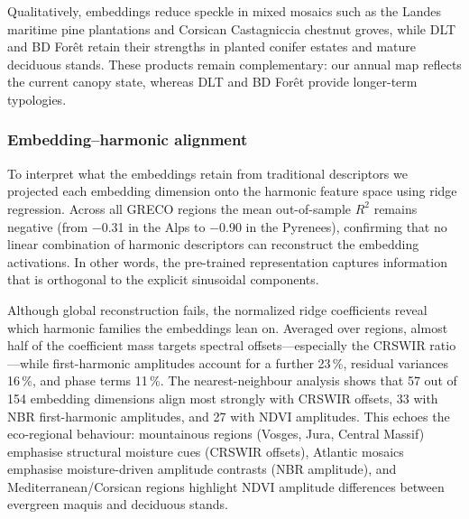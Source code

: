 \documentclass[utf8]{FrontiersinHarvard}
\begin{document}
Qualitatively, embeddings reduce speckle in mixed mosaics such as the Landes maritime pine plantations and Corsican Castagniccia chestnut groves, while DLT and BD Forêt retain their strengths in planted conifer estates and mature deciduous stands. These products remain complementary: our annual map reflects the current canopy state, whereas DLT and BD Forêt provide longer-term typologies.

\subsubsection{Embedding–harmonic alignment}

To interpret what the embeddings retain from traditional descriptors we projected each embedding dimension onto the harmonic feature space using ridge regression. Across all GRECO regions the mean out-of-sample \(R^2\) remains negative (from −0.31 in the Alps to −0.90 in the Pyrenees), confirming that no linear combination of harmonic descriptors can reconstruct the embedding activations. In other words, the pre-trained representation captures information that is orthogonal to the explicit sinusoidal components.

Although global reconstruction fails, the normalized ridge coefficients reveal which harmonic families the embeddings lean on. Averaged over regions, almost half of the coefficient mass targets spectral offsets—especially the CRSWIR ratio—while first-harmonic amplitudes account for a further 23\,\%, residual variances 16\,\%, and phase terms 11\,\%. The nearest-neighbour analysis shows that 57 out of 154 embedding dimensions align most strongly with CRSWIR offsets, 33 with NBR first-harmonic amplitudes, and 27 with NDVI amplitudes. This echoes the eco-regional behaviour: mountainous regions (Vosges, Jura, Central Massif) emphasise structural moisture cues (CRSWIR offsets), Atlantic mosaics emphasise moisture-driven amplitude contrasts (NBR amplitude), and Mediterranean/Corsican regions highlight NDVI amplitude differences between evergreen maquis and deciduous stands.
\end{document}
